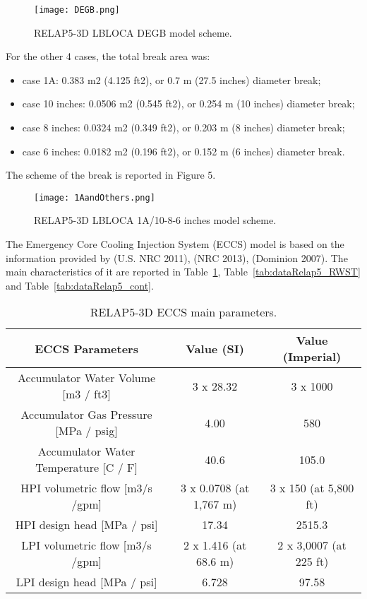\begin{figure}
    \centering
    \texttt{[image: DEGB.png]}
    \caption{RELAP5-3D LBLOCA DEGB model scheme.}
    \label{fig:debg}
\end{figure} 

For the other 4 cases, the total break area was:
\begin{itemize}
	\item case 1A: 0.383 m2 (4.125 ft2), or 0.7 m (27.5 inches) diameter break;
	\item case 10 inches: 0.0506 m2 (0.545 ft2), or 0.254 m (10 inches) diameter break;
	\item case 8 inches: 0.0324 m2 (0.349 ft2), or 0.203 m (8 inches) diameter break;
	\item case 6 inches: 0.0182 m2 (0.196 ft2), or 0.152 m (6 inches) diameter break.
\end{itemize}

The scheme of the break is reported in Figure 5.

\begin{figure}
    \centering
    \texttt{[image: 1AandOthers.png]}
    \caption{RELAP5-3D LBLOCA 1A/10-8-6 inches model scheme.}
    \label{fig:1AandOthers}
\end{figure} 

The Emergency Core Cooling Injection System (ECCS) model is based on the information provided by (U.S. NRC 2011), (NRC 2013), (Dominion 2007). The main characteristics of it are reported in Table~\ref{tab:dataRelap5_ECCS}, Table~\ref{tab:dataRelap5_RWST} and Table~\ref{tab:dataRelap5_cont}. 

\begin{table}
  \caption{RELAP5-3D ECCS main parameters.}
  \centering
  \begin{tabular}{c | c | c} 
    \hline 
     ECCS Parameters & Value (SI) & Value (Imperial) \\
    \hline 
    Accumulator Water Volume [m3 / ft3] & 3 x 28.32 & 3 x 1000 \\
    Accumulator Gas Pressure [MPa / psig] & 4.00 & 580 \\
    Accumulator Water Temperature [C / F] & 40.6 & 105.0 \\
    HPI volumetric flow [m3/s /gpm] & 3 x 0.0708 (at 1,767 m) & 3 x 150 (at 5,800 ft) \\
    HPI design head [MPa / psi] & 17.34 & 2515.3 \\
    LPI volumetric flow [m3/s /gpm] & 2 x 1.416 (at 68.6 m) & 2 x 3,0007 (at 225 ft) \\
    LPI design head [MPa / psi] & 6.728 & 97.58 \\
    \hline 
  \end{tabular}
  \label{tab:dataRelap5_ECCS}
\end{table}

